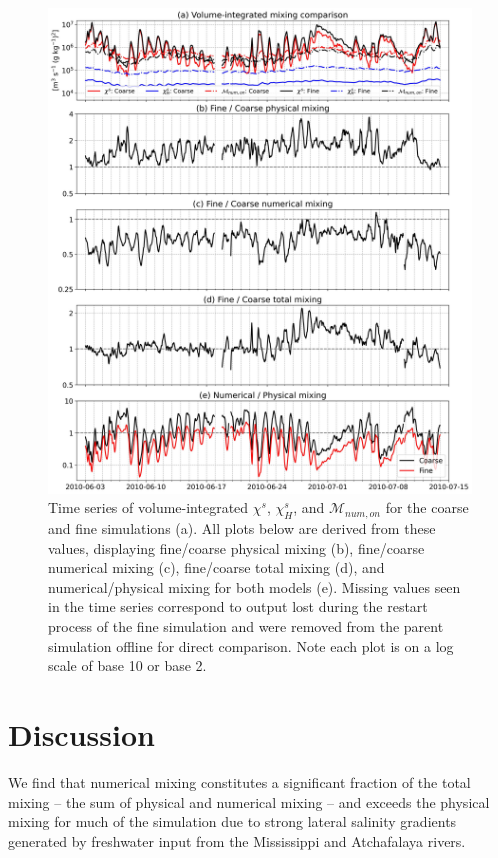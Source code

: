 \begin{figure}
 \centerline{\includegraphics[width = 0.9\linewidth]{figures/james_2023/Figure9_vintegrated.jpg}}
  \caption{Time series of volume-integrated $\chi^s$, $\chi_H^s$,  and $\mathcal{M}_{num, on}$ for the coarse and fine simulations (a). All plots below are derived from these values, displaying fine/coarse physical mixing (b), fine/coarse numerical mixing (c), fine/coarse total mixing (d), and numerical/physical mixing for both models (e). Missing values seen in the time series correspond to output lost during the restart process of the fine simulation and were removed from the parent simulation offline for direct comparison. Note each plot is on a log scale of base 10 or base 2.}
  \label{fig:volume-integrated}
\end{figure}

\section{Discussion} \label{sec:discussion}

We find that numerical mixing constitutes a significant fraction of the total mixing -- the sum of physical and numerical mixing -- and exceeds the physical mixing for much of the simulation due to strong lateral salinity gradients generated by freshwater input from the Mississippi and Atchafalaya rivers.

